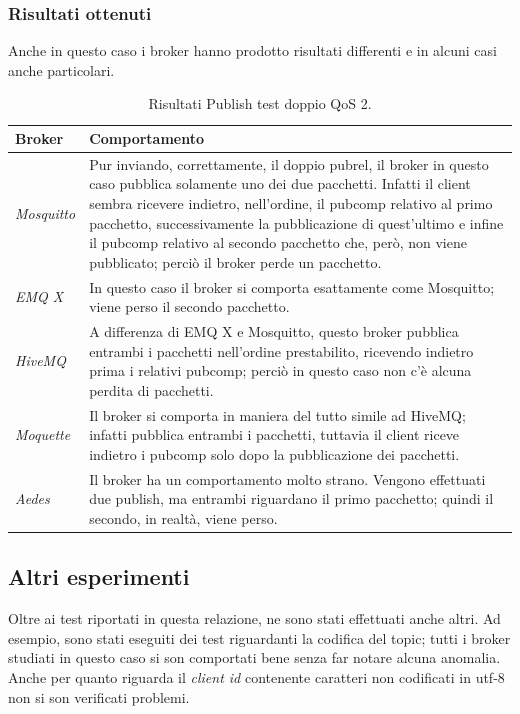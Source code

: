 \documentclass[binding=0.6cm,TFA]{sapthesis}
\begin{document}
\begin{large}
\subsubsection{Risultati ottenuti}
Anche in questo caso i broker hanno prodotto risultati differenti e in alcuni casi anche particolari.

\begin{table}[h]
\caption{Risultati Publish test doppio QoS 2.}
\label{tab:resultsdoubleqos2}
\begin{tabular}{lp{}}
\toprule
\textbf{Broker} & \textbf{Comportamento} \\
\midrule
\textit{Mosquitto} & Pur inviando, correttamente, il doppio pubrel, il broker in questo caso pubblica solamente uno dei due pacchetti. Infatti il client sembra ricevere indietro, nell'ordine, il pubcomp relativo al primo pacchetto, successivamente la pubblicazione di quest'ultimo e infine il pubcomp relativo al secondo pacchetto che, però, non viene pubblicato; perciò il broker perde un pacchetto.\\
\textit{EMQ X} & In questo caso il broker si comporta esattamente come Mosquitto; viene perso il secondo pacchetto. \\
\textit{HiveMQ} & A differenza di EMQ X e Mosquitto, questo broker pubblica entrambi i pacchetti nell'ordine prestabilito, ricevendo indietro prima i relativi pubcomp; perciò in questo caso non c'è alcuna perdita di pacchetti. \\
\textit{Moquette} & Il broker si comporta in maniera del tutto simile ad HiveMQ; infatti pubblica entrambi i pacchetti, tuttavia il client riceve indietro i pubcomp solo dopo la pubblicazione dei pacchetti.\\
\textit{Aedes} & Il broker ha un comportamento molto strano. Vengono effettuati due publish, ma entrambi riguardano il primo pacchetto; quindi il secondo, in realtà, viene perso.\\
\bottomrule
\end{tabular}
\end{table}

\subsection{Altri esperimenti}
Oltre ai test riportati in questa relazione, ne sono stati effettuati anche altri. Ad esempio, sono stati eseguiti dei test riguardanti la codifica del topic; tutti i broker studiati in questo caso si son comportati bene senza far notare alcuna anomalia. Anche per quanto riguarda il \textit{client id} contenente caratteri non codificati in utf-8 non si son verificati problemi. \\


\end{large}
\end{document}
